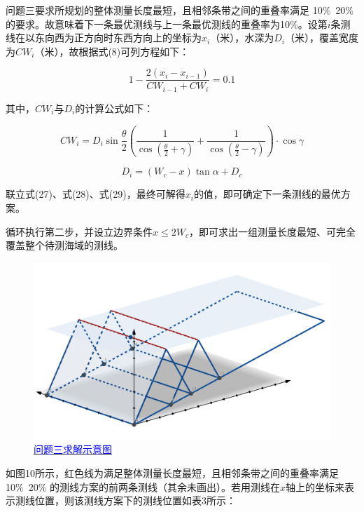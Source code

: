 问题三要求所规划的整体测量长度最短，且相邻条带之间的重叠率满足 10\%~20\% 的要求。故意味着下一条最优测线与上一条最优测线的重叠率为10\%。设第$i$条测线在以东向西为正方向时东西方向上的坐标为$x_i$（米），水深为$D_i$（米），覆盖宽度为$CW_i$（米），故根据式(8)可列方程如下：

\begin{equation}
    1-\frac{2(x_i-x_{i-1})}{CW_{i-1}+CW_i} = 0.1
\end{equation}

其中，$CW_i$与$D_i$的计算公式如下：

\begin{equation}
    CW_i = D_i\sin\frac{\theta}{2}\left(\frac{1}{\cos(\frac{\theta}{2}+\gamma)} + \frac{1}{\cos(\frac{\theta}{2}-\gamma)}\right) \cdot \cos \gamma
\end{equation}

\begin{equation}
    D_i =  (W_c - x) \tan{\alpha} + D_c
\end{equation}

联立式(27)、式(28)、式(29)，最终可解得$x_i$的值，即可确定下一条测线的最优方案。

循环执行第二步，并设立边界条件$ x \leq 2W_c $，即可求出一组测量长度最短、可完全覆盖整个待测海域的测线。



\begin{figure}[h]   
    \centering
    \includegraphics[scale=0.4]{res/img/问题三示意图.png}
    \caption{\href{https://www.geogebra.org/classic/bvejtecw}{\textcolor{blue}{问题三求解示意图}}}
    \label{fig:问题三求解示意图}
\end{figure}

如图10所示，红色线为满足整体测量长度最短，且相邻条带之间的重叠率满足 10\%~20\% 的测线方案的前两条测线（其余未画出）。若用测线在$x$轴上的坐标来表示测线位置，则该测线方案下的测线位置如表3所示：

